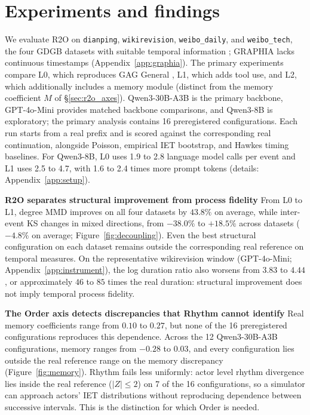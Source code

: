 \documentclass{article}
\begin{document}
\section{Experiments and findings}
\label{sec:results}


We evaluate R2O on \texttt{dianping}, \texttt{wikirevision},
\texttt{weibo\_daily}, and \texttt{weibo\_tech}, the four GDGB datasets with
suitable temporal information \citep{peng2025gdgb}; GRAPHIA lacks continuous
timestamps (Appendix~\ref{app:graphia}). The primary experiments compare L0, which reproduces GAG General \citep{ji2025gag}, L1,
which adds tool use, and L2, which additionally includes a memory module
(distinct from the memory coefficient $M$ of \S\ref{sec:r2o_axes}). Qwen3-30B-A3B
is the primary backbone, GPT-4o-Mini provides matched backbone comparisons, and
Qwen3-8B is exploratory; the primary analysis contains 16 preregistered
configurations. Each run starts from a real prefix and is scored against the
corresponding real continuation, alongside Poisson, empirical IET bootstrap,
and Hawkes timing baselines. For Qwen3-8B, L0 uses 1.9 to 2.8 language model
calls per event and L1 uses 2.5 to 4.7, with 1.6 to 2.4 times more prompt
tokens (details: Appendix~\ref{app:setup}).

\noindent \textbf{R2O separates structural improvement from process fidelity}
From L0 to L1, degree MMD improves on all four datasets by $43.8\%$ on
average, while inter-event KS changes in mixed directions, from $-38.0\%$ to
$+18.5\%$ across datasets ($-4.8\%$ on average; Figure~\ref{fig:decoupling}). Even the best structural configuration on each
dataset remains outside the corresponding real reference on temporal measures.
On the representative wikirevision window (GPT-4o-Mini;
Appendix~\ref{app:instrument}), the log duration ratio also worsens from
$3.83$ to $4.44$, or approximately $46$ to $85$ times the real duration:
structural improvement does not imply temporal process fidelity.

\noindent \textbf{The Order axis detects discrepancies that Rhythm cannot identify}
Real memory coefficients range from $0.10$ to $0.27$, but none of the 16 preregistered
 configurations reproduces this dependence. Across the 12 Qwen3-30B-A3B
 configurations, memory ranges from $-0.28$ to $0.03$, and every
configuration lies outside the real reference range on the memory discrepancy
(Figure~\ref{fig:memory}). Rhythm fails less uniformly: actor level rhythm divergence lies inside the
real reference ($|Z| \le 2$) on 7 of the 16 configurations, so a simulator can approach
actors' IET distributions without reproducing dependence between successive
intervals. This is the distinction for which Order is
needed.
\end{document}

